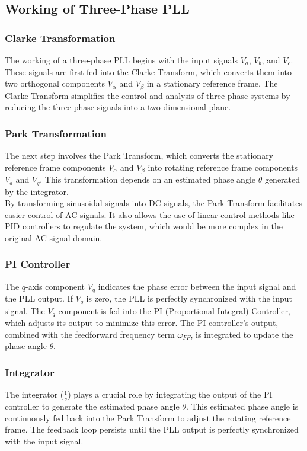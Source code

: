 \subsection{Working of Three-Phase PLL}

\subsubsection{Clarke Transformation}
The working of a three-phase PLL begins with the input signals \(V_a\),
\(V_b\), and \(V_c\). These signals are first fed into the Clarke Transform,
which converts them into two orthogonal components \(V_\alpha\) and \(V_\beta\)
in a stationary reference frame. The Clarke Transform simplifies the control
and analysis of three-phase systems by reducing the three-phase signals into a
two-dimensional plane.

\subsubsection{Park Transformation}
The next step involves the Park Transform, which converts the stationary
reference frame components \(V_\alpha\) and \(V_\beta\) into rotating reference
frame components \(V_d\) and \(V_q\). This transformation depends on an
estimated phase angle \(\theta\) generated by the integrator.\\

By transforming sinusoidal signals into DC signals, the Park Transform
facilitates easier control of AC signals. It also allows the use of linear
control methods like PID controllers to regulate the system, which would be
more complex in the original AC signal domain.

\subsubsection{PI Controller}
The \(q\)-axis component \(V_q\) indicates the phase error between the input
signal and the PLL output. If \(V_q\) is zero, the PLL is perfectly
synchronized with the input signal. The \(V_q\) component is fed into the PI
(Proportional-Integral) Controller, which adjusts its output to minimize this
error. The PI controller's output, combined with the feedforward frequency term
\(\omega_{FF}\), is integrated to update the phase angle \(\theta\).

\subsubsection{Integrator}
The integrator (\(\frac{1}{s}\)) plays a crucial role by integrating the output
of the PI controller to generate the estimated phase angle \(\theta\). This
estimated phase angle is continuously fed back into the Park Transform to
adjust the rotating reference frame. The feedback loop persists until the PLL
output is perfectly synchronized with the input signal.

